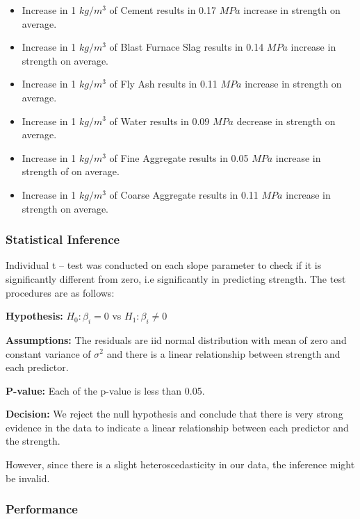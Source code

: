\documentclass[letterpaper,9pt,twocolumn,twoside,]{pinp}
\providecommand{\tightlist}{%
  \setlength{\itemsep}{0pt}\setlength{\parskip}{0pt}}
\begin{document}
\begin{itemize}
\tightlist
\item
  Increase in 1 \(kg/m^3\) of Cement results in 0.17 \(MPa\) increase in
  strength on average.
\item
  Increase in 1 \(kg/m^3\) of Blast Furnace Slag results in 0.14 \(MPa\)
  increase in strength on average.
\item
  Increase in 1 \(kg/m^3\) of Fly Ash results in 0.11 \(MPa\) increase
  in strength on average.
\item
  Increase in 1 \(kg/m^3\) of Water results in 0.09 \(MPa\) decrease in
  strength on average.
\item
  Increase in 1 \(kg/m^3\) of Fine Aggregate results in 0.05 \(MPa\)
  increase in strength of on average.
\item
  Increase in 1 \(kg/m^3\) of Coarse Aggregate results in 0.11 \(MPa\)
  increase in strength on average.
\end{itemize}

\hypertarget{statistical-inference}{%
\subsubsection{Statistical Inference}\label{statistical-inference}}

Individual t -- test was conducted on each slope parameter to check if
it is significantly different from zero, i.e significantly in predicting
strength. The test procedures are as follows:

\textbf{Hypothesis:} \(H_{0}: \beta_{i} = 0\) vs
\(H_{1}:\beta_{i} \neq 0\)

\textbf{Assumptions:} The residuals are iid normal distribution with
mean of zero and constant variance of \({\sigma}^2\) and there is a
linear relationship between strength and each predictor.

\textbf{P-value:} Each of the p-value is less than 0.05.

\textbf{Decision:} We reject the null hypothesis and conclude that there
is very strong evidence in the data to indicate a linear relationship
between each predictor and the strength.

However, since there is a slight heteroscedasticity in our data, the
inference might be invalid.

\hypertarget{performance}{%
\subsubsection{Performance}\label{performance}}
\end{document}
